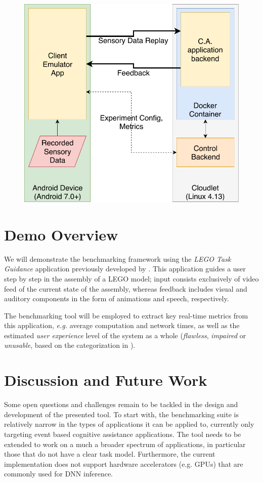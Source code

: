 \begin{figure}
  \centering
  \includegraphics[width=.7\columnwidth]{publications/2018DemoScalingOnTheEdge/img/TraceReplay_GenArch}
  \label{fig:TraceReplayArch}
\end{figure}

\section{Demo Overview}

We will demonstrate the benchmarking framework using the \emph{LEGO Task Guidance} application previously developed by \textcite{Chen2015Early}.
This application guides a user step by step in the assembly of a LEGO model; input consists exclusively of video feed of the current state of the assembly, whereas feedback includes visual and auditory components in the form of animations and speech, respectively.

The benchmarking tool will be employed to extract key real-time metrics from this application, \emph{e.g.} average computation and network times, as well as the estimated \emph{user experience} level of the system as a whole (\emph{flawless}, \emph{impaired} or \emph{unusable}, based on the categorization in \cite{Chen2017Empirical}).

\section{Discussion and Future Work}

Some open questions and challenges remain to be tackled in the design and development of the presented tool.
To start with, the benchmarking suite is relatively narrow in the types of applications it can be applied to, currently only targeting event based cognitive assistance applications.
The tool needs to be extended to work on a much a broader spectrum of applications, in particular those that do not have a clear task model.
Furthermore, the current implementation does not support hardware accelerators (e.g. GPUs) that are commonly used for DNN inference.

